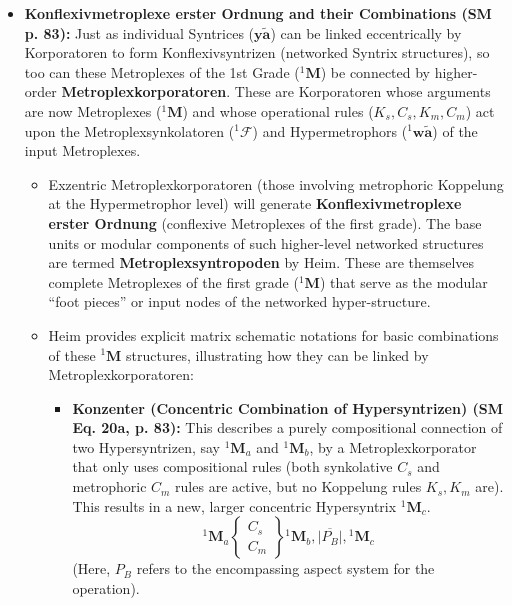 \documentclass[12pt]{article}
\newcommand{\q}[1]{\enquote{#1}}
\newcommand{\syntrix}{\bm{y\widetilde{a}}}
\newcommand{\aspektivsystem}{P}
\newcommand{\metroplex}[1]{{}^{#1}\mathbf{M}}
\newcommand{\hypersyntrix}{\metroplex{1}}
\newcommand{\hypermetrophor}[1]{{}^{#1}\mathbf{w\widetilde{a}}}
\newcommand{\metroplexsynkolator}[1]{{}^{#1}\mathcal{F}}
\begin{document}
\begin{itemize}
    \item \textbf{Konflexivmetroplexe erster Ordnung and their Combinations (SM p. 83):}
    Just as individual Syntrices (\(\syntrix\)) can be linked eccentrically by Korporatoren to form Konflexivsyntrizen (networked Syntrix structures), so too can these Metroplexes of the 1st Grade (\(\hypersyntrix\)) be connected by higher-order \textbf{Metroplexkorporatoren}. These are Korporatoren whose arguments are now Metroplexes (\(\hypersyntrix\)) and whose operational rules (\(K_s, C_s, K_m, C_m\)) act upon the Metroplexsynkolatoren (\(\metroplexsynkolator{1}\)) and Hypermetrophors (\(\hypermetrophor{1}\)) of the input Metroplexes.
    \begin{itemize}
        \item Exzentric Metroplexkorporatoren (those involving metrophoric Koppelung at the Hypermetrophor level) will generate \textbf{Konflexivmetroplexe erster Ordnung} (conflexive Metroplexes of the first grade). The base units or modular components of such higher-level networked structures are termed \textbf{Metroplexsyntropoden} by Heim. These are themselves complete Metroplexes of the first grade (\(\hypersyntrix\)) that serve as the modular \q{foot pieces} or input nodes of the networked hyper-structure.
        \item Heim provides explicit matrix schematic notations for basic combinations of these \( \hypersyntrix \) structures, illustrating how they can be linked by Metroplexkorporatoren:
        \begin{itemize}
            \item \textbf{Konzenter (Concentric Combination of Hypersyntrizen) (SM Eq. 20a, p. 83):} This describes a purely compositional connection of two Hypersyntrizen, say \( \hypersyntrix_a \) and \( \hypersyntrix_b \), by a Metroplexkorporator that only uses compositional rules (both synkolative \( C_s \) and metrophoric \( C_m \) rules are active, but no Koppelung rules \(K_s, K_m\) are). This results in a new, larger concentric Hypersyntrix \( \hypersyntrix_c \).
            \begin{equation}
            \hypersyntrix_a \begin{Bmatrix} C_s \\ C_m \end{Bmatrix} \hypersyntrix_b, \overline{|\aspektivsystem_B|}, \hypersyntrix_c 
            \tag{20a}
            \end{equation}
            (Here, \( \aspektivsystem_B \) refers to the encompassing aspect system for the operation).

\end{itemize}
\end{itemize}
\end{itemize}
\end{document}
